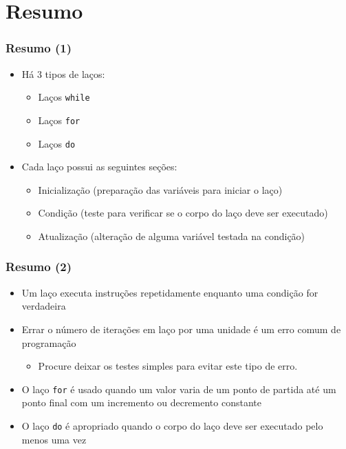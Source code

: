 \documentclass[xcolor={dvipsnames,table},aspectratio=169]{beamer}
\begin{document}
\section{Resumo}

\begin{frame}\frametitle{Resumo (1)}
\begin{itemize}
	\item Há 3 tipos de laços:
	\begin{itemize}
		\item Laços \texttt{while}
		\item Laços \texttt{for}
		\item Laços \texttt{do}
	\end{itemize}
	\item Cada laço possui as seguintes seções:
	\begin{itemize}
		\item Inicialização (preparação das variáveis para iniciar o laço)
		\item Condição (teste para verificar se o corpo do laço deve ser executado)
		\item Atualização (alteração de alguma variável testada na condição)
	\end{itemize}
\end{itemize}
\end{frame}

\begin{frame}\frametitle{Resumo (2)}
\begin{itemize}
	\item Um laço executa instruções repetidamente enquanto uma condição for verdadeira
	\item Errar o número de iterações em laço por uma unidade é um erro comum de programação
	\begin{itemize}
		\item Procure deixar os testes simples para evitar este tipo de erro.
	\end{itemize}
	\item O laço \texttt{for} é usado quando um valor varia de um ponto de partida até um ponto final com um incremento ou decremento constante
	\item O laço \texttt{do} é apropriado quando o corpo do laço deve ser executado pelo menos uma vez
\end{itemize}
\end{frame}
\end{document}
